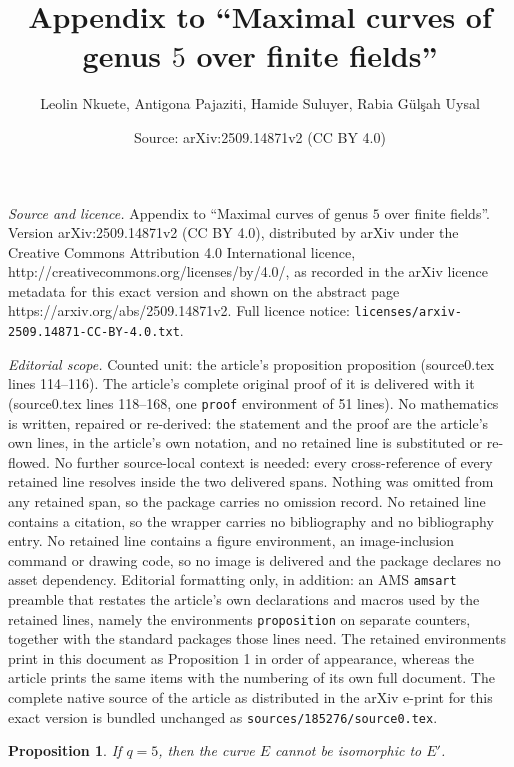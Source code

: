 \documentclass[10pt,a4paper]{amsart}
\title{Appendix to ``Maximal curves of genus $5$ over finite fields''}
\author{Leolin Nkuete, Antigona Pajaziti, Hamide Suluyer, Rabia G\"ul\c{s}ah Uysal}
\date{Source: arXiv:2509.14871v2 (CC BY 4.0)}
\newtheorem{proposition}{Proposition}
\begin{document}
\maketitle

\noindent\emph{Source and licence.} Appendix to ``Maximal curves of genus $5$ over finite fields''. Version arXiv:2509.14871v2 (CC BY 4.0), distributed by arXiv under the Creative Commons Attribution 4.0 International licence, http://creativecommons.org/licenses/by/4.0/, as recorded in the arXiv licence metadata for this exact version and shown on the abstract page https://arxiv.org/abs/2509.14871v2. Full licence notice: \texttt{licenses/arxiv-2509.14871-CC-BY-4.0.txt}.\par\smallskip

\noindent\textit{Editorial scope.} Counted unit: the article's proposition proposition (source0.tex lines 114--116). The article's complete original proof of it is delivered with it (source0.tex lines 118--168, one \texttt{proof} environment of 51 lines). No mathematics is written, repaired or re-derived: the statement and the proof are the article's own lines, in the article's own notation, and no retained line is substituted or re-flowed.  No further source-local context is needed: every cross-reference of every retained line resolves inside the two delivered spans.  Nothing was omitted from any retained span, so the package carries no omission record.  No retained line contains a citation, so the wrapper carries no bibliography and no bibliography entry.  No retained line contains a figure environment, an image-inclusion command or drawing code, so no image is delivered and the package declares no asset dependency.  Editorial formatting only, in addition: an AMS \texttt{amsart} preamble that restates the article's own declarations and macros used by the retained lines, namely the environments \texttt{proposition} on separate counters, together with the standard packages those lines need.  The retained environments print in this document as Proposition 1 in order of appearance, whereas the article prints the same items with the numbering of its own full document.  The complete native source of the article as distributed in the arXiv e-print for this exact version is bundled unchanged as \texttt{sources/185276/source0.tex}.
\begin{proposition}
If $q=5$, then the curve $E$ cannot be isomorphic to $E'$.
\end{proposition}
\end{document}
